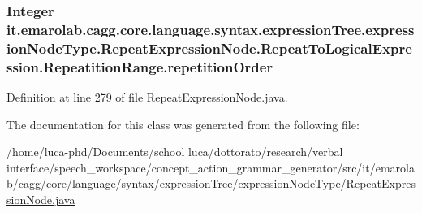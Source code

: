 \hypertarget{classit_1_1emarolab_1_1cagg_1_1core_1_1language_1_1syntax_1_1expressionTree_1_1expressionNodeTyp7498902e136f0103368e78415adbf7d0_aa28ffbea59c07cf18c0291c56c5bb025}{
\subsubsection[{repetition\-Order}]{\setlength{\rightskip}{0pt plus 5cm}Integer it.\-emarolab.\-cagg.\-core.\-language.\-syntax.\-expression\-Tree.\-expression\-Node\-Type.\-Repeat\-Expression\-Node.\-Repeat\-To\-Logical\-Expression.\-Repeatition\-Range.\-repetition\-Order\hspace{0.3cm}{\ttfamily [private]}}}\label{classit_1_1emarolab_1_1cagg_1_1core_1_1language_1_1syntax_1_1expressionTree_1_1expressionNodeTyp7498902e136f0103368e78415adbf7d0_aa28ffbea59c07cf18c0291c56c5bb025}


Definition at line 279 of file Repeat\-Expression\-Node.\-java.



The documentation for this class was generated from the following file\-:\begin{DoxyCompactItemize}
\item 
/home/luca-\/phd/\-Documents/school luca/dottorato/research/verbal interface/speech\-\_\-workspace/concept\-\_\-action\-\_\-grammar\-\_\-generator/src/it/emarolab/cagg/core/language/syntax/expression\-Tree/expression\-Node\-Type/\hyperlink{RepeatExpressionNode_8java}{Repeat\-Expression\-Node.\-java}\end{DoxyCompactItemize}
